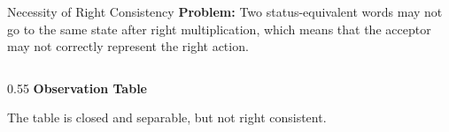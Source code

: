 \documentclass{beamer}
\begin{document}
\begin{frame}{Necessity of Right Consistency}
    \textbf{Problem:} Two status-equivalent words may not go to the same state after right multiplication, which means that the acceptor may not correctly represent the right action.
    \begin{columns}[T]
        \begin{column}{0.55\textwidth}
            \centering
            \textbf{Observation Table}

            \begin{table}
                \centering
            \end{table}
            \vspace{0.2cm}
                The table is closed and separable, but not right consistent.
        \end{column}


\end{columns}
\end{frame}
\end{document}
